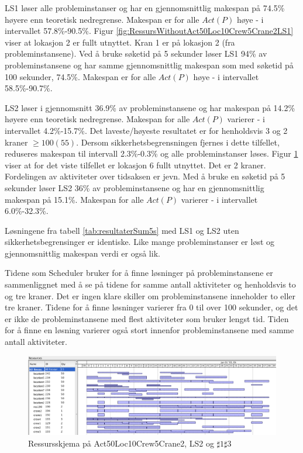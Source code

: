 LS1 løser alle probleminstanser og har en gjennomsnittlig makespan på 74.5\% høyere enn teoretisk nedregrense. Makespan er for alle $Act(P)$ høye - i intervallet 57.8\%-90.5\%. Figur \ref{fig:RessursWithoutAct50Loc10Crew5Crane2LS1} viser at lokasjon 2 er fullt utnyttet. Kran 1 er på lokasjon 2 (fra probleminstansene). Ved å bruke søketid på 5 sekunder løser LS1 94\% av probleminstansene og har samme gjennomsnittlig makespan som med søketid på 100 sekunder, 74.5\%. Makespan er for alle $Act(P)$ høye - i intervallet 58.5\%-90.7\%.

LS2 løser i gjennomsnitt 36.9\% av probleminstansene og har makespan på 14.2\% høyere enn teoretisk nedregrense. Makespan for alle $Act(P)$ varierer - i intervallet 4.2\%-15.7\%. Det laveste/høyeste resultatet er for henholdsvis 3 og 2 kraner $\ge 100(55)$. Dersom sikkerhetsbegrensningen fjernes i dette tilfellet, reduseres makespan til intervall 2.3\%-0.3\% og alle probleminstanser løses. Figur \ref{fig:ResourceAct50Crane2LS2_UtenVarme_100s} viser at for det viste tilfellet er lokasjon 6 fullt utnyttet. Det er 2 kraner. Fordelingen av aktiviteter over tidsaksen er jevn. Med å bruke en søketid på 5 sekunder løser LS2 36\% av probleminstansene og har en gjennomsnittlig makespan på 15.1\%. Makespan for alle $Act(P)$ varierer - i intervallet 6.0\%-32.3\%.

Løsningene fra tabell \ref{tab:resultaterSum5s} med LS1 og LS2 uten sikkerhetsbegrensinger er identiske. Like mange probleminstanser er løst og gjennomsnittlig makespan verdi er også lik.

Tidene som Scheduler bruker for å finne løsninger på probleminstansene er sammenliggnet med å se på tidene for samme antall aktiviteter og henholdsvis to og tre kraner. Det er ingen klare skiller om probleminstansene inneholder to eller tre kraner. Tidene for å finne løsninger varierer fra 0 til over 100 sekunder, og det er ikke de probleminstansene med flest aktiviteter som bruker lengst tid. Tiden for å finne en løsning varierer også stort innenfor probleminstansene med samme antall aktiviteter.
\begin{figure}[!h]
\centering
\includegraphics[scale=0.4]{content/gfx/ResourceAct50Crane2LS2_UtenVarme_100s}
\caption{Ressursskjema på Act50Loc10Crew5Crane2, LS2 og $\sharp1\sharp3$}
\label{fig:ResourceAct50Crane2LS2_UtenVarme_100s}
\end{figure}

